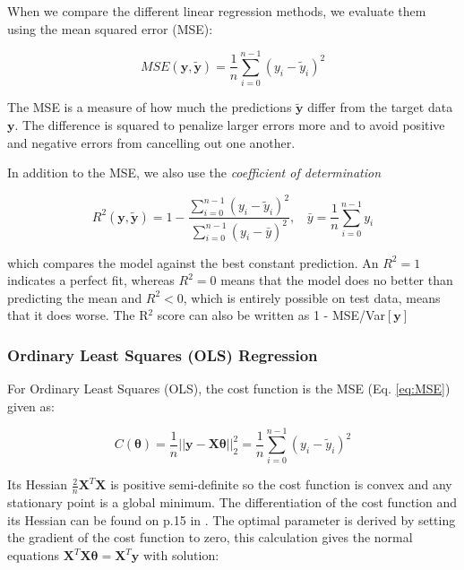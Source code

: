 \documentclass[reprint,english,notitlepage]{revtex4-2}  %
\begin{document}
When we compare the different linear regression methods, we evaluate them using the mean squared error (MSE):

\begin{equation}\label{eq:MSE}
    MSE(\bm{y,\tilde{y}}) = \frac{1}{n}\sum_{i=0}^{n-1} (y_i - \tilde{y}_i)^2
\end{equation}

The MSE is a measure of how much the predictions $\bm{\tilde{y}}$ differ from the target data $\bm{y}$. The difference is squared to penalize larger errors more and to avoid positive and negative errors from cancelling out one another. 

In addition to the MSE, we also use the \emph{coefficient of determination}

\begin{equation*}
    R^2(\bm{y, \tilde{y}}) = 1 - \frac{\sum_{i=0}^{n-1}(y_i - \tilde{y}_i)^2}{\sum_{i=0}^{n-1}(y_i - \bar{y})^2}, \ \ \ \ \bar{y} = \frac{1}{n} \sum_{i=0}^{n-1}y_i 
\end{equation*}

which compares the model against the best constant prediction. An $R^2 = 1$ indicates a perfect fit, whereas $R^2 = 0$ means that the model does no better than predicting the mean and $R^2 < 0$, which is entirely possible on test data, means that it does worse. The R$^2$ score can also be written as 1 - MSE/Var$[\bm{y}]$ \cite{lecture_book} 


\subsubsection{Ordinary Least Squares (OLS) Regression}
For Ordinary Least Squares (OLS), the cost function is the MSE (Eq. \ref{eq:MSE}) given as:

\begin{equation}\label{eq:Cost_OLS}
    C(\bm{\theta}) = \frac{1}{n}||\bm{y} - \bm{X\theta}||_2^2 = \frac{1}{n}\sum_{i=0}^{n-1} (y_i - \tilde{y}_i)^2
\end{equation}

Its Hessian  $\frac{2}{n}\bm{X}^T\bm{X}$ is positive semi-definite so the cost function is convex and any stationary point is a global minimum. The differentiation of the cost function and its Hessian can be found on p.15 in \cite{lecture_book}. The optimal parameter is derived by setting the gradient of the cost function to zero, this calculation gives the normal equations $\bm{X}^T \bm{X\theta} = \bm{X}^T\bm{y}$ with solution:
\end{document}
